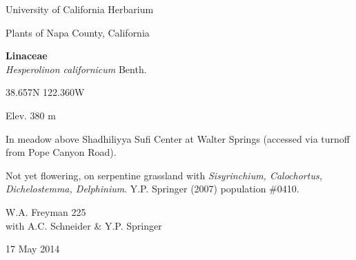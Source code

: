 \documentclass[letterpaper,10pt]{article}
\begin{document}
\begin{minipage}[t]{0.40\textwidth}

\begin{center}
University of California Herbarium \\
\begin{large}
Plants of Napa County, California \\
\end{large}
\vspace{\baselineskip}
\textbf{Linaceae} \\
\textit{Hesperolinon californicum} Benth.\\
\end{center}

\begin{footnotesize}

\begin{multicols}{2}
38.657\textdegree N 122.360\textdegree W
\columnbreak
\begin{flushright}
Elev. 380 m
\end{flushright}
\end{multicols}

In meadow above Shadhiliyya Sufi Center at Walter Springs (accessed via turnoff from Pope Canyon Road).
\vspace{\baselineskip}

Not yet flowering, on serpentine grassland with \textit{Sisyrinchium, Calochortus, Dichelostemma, Delphinium}. Y.P. Springer (2007) population \#0410.

\begin{multicols}{2}
W.A. Freyman 225 \\
with A.C. Schneider \& Y.P. Springer
\columnbreak
\begin{flushright}
17 May 2014
\end{flushright}
\end{multicols}

\end{footnotesize}

\end{minipage}
%
\hspace{2cm}
%
\end{document}
